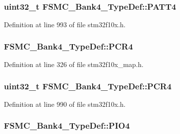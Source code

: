 \subsubsection[{\texorpdfstring{P\+A\+T\+T4}{PATT4}}]{ {\bf uint32\+\_\+t} F\+S\+M\+C\+\_\+\+Bank4\+\_\+\+Type\+Def\+::\+P\+A\+T\+T4}\hypertarget{struct_f_s_m_c___bank4___type_def_a4cccc7802b573135311cc38e7f247ff5}{}\label{struct_f_s_m_c___bank4___type_def_a4cccc7802b573135311cc38e7f247ff5}


Definition at line 993 of file stm32f10x.\+h.

\subsubsection[{\texorpdfstring{P\+C\+R4}{PCR4}}]{ F\+S\+M\+C\+\_\+\+Bank4\+\_\+\+Type\+Def\+::\+P\+C\+R4}\hypertarget{struct_f_s_m_c___bank4___type_def_a52bca427553f7e53a643f61918464575}{}\label{struct_f_s_m_c___bank4___type_def_a52bca427553f7e53a643f61918464575}


Definition at line 326 of file stm32f10x\+\_\+map.\+h.

\subsubsection[{\texorpdfstring{P\+C\+R4}{PCR4}}]{ {\bf uint32\+\_\+t} F\+S\+M\+C\+\_\+\+Bank4\+\_\+\+Type\+Def\+::\+P\+C\+R4}\hypertarget{struct_f_s_m_c___bank4___type_def_a0470b5bbb53e9f1bbde09829371eb72f}{}\label{struct_f_s_m_c___bank4___type_def_a0470b5bbb53e9f1bbde09829371eb72f}


Definition at line 990 of file stm32f10x.\+h.

\subsubsection[{\texorpdfstring{P\+I\+O4}{PIO4}}]{ F\+S\+M\+C\+\_\+\+Bank4\+\_\+\+Type\+Def\+::\+P\+I\+O4}\hypertarget{struct_f_s_m_c___bank4___type_def_a79d11d090c377cd6fd77d40abdfff475}{}\label{struct_f_s_m_c___bank4___type_def_a79d11d090c377cd6fd77d40abdfff475}


